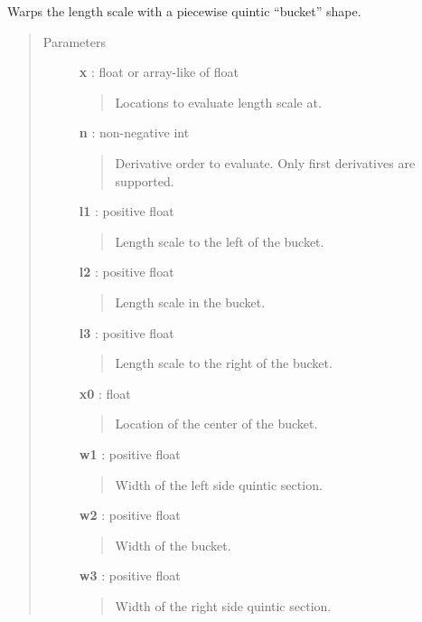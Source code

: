 \documentclass[letterpaper,10pt,english]{sphinxmanual}
\begin{document}

\begin{fulllineitems}
\label{gptools.kernel:gptools.kernel.gibbs.quintic_bucket_warp}
Warps the length scale with a piecewise quintic ``bucket'' shape.
\begin{quote}\begin{description}
\item[{Parameters}] \leavevmode
\textbf{x} : float or array-like of float
\begin{quote}

Locations to evaluate length scale at.
\end{quote}

\textbf{n} : non-negative int
\begin{quote}

Derivative order to evaluate. Only first derivatives are supported.
\end{quote}

\textbf{l1} : positive float
\begin{quote}

Length scale to the left of the bucket.
\end{quote}

\textbf{l2} : positive float
\begin{quote}

Length scale in the bucket.
\end{quote}

\textbf{l3} : positive float
\begin{quote}

Length scale to the right of the bucket.
\end{quote}

\textbf{x0} : float
\begin{quote}

Location of the center of the bucket.
\end{quote}

\textbf{w1} : positive float
\begin{quote}

Width of the left side quintic section.
\end{quote}

\textbf{w2} : positive float
\begin{quote}

Width of the bucket.
\end{quote}

\textbf{w3} : positive float
\begin{quote}

Width of the right side quintic section.
\end{quote}

\end{description}\end{quote}

\end{fulllineitems}
\end{document}
